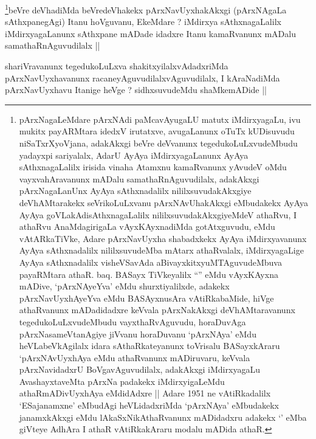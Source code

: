 
\begin{artha}
\footnote[1]{pArxNagaLeMdare pArxNAdi paMcavAyugaLU matutx
  iMdirxyagaLu, ivu mukitx payARMtara idedxV irutatxve, avugaLanunx
  oTuTx kUDisuvudu niSaTxrXyoVjana, adakAkxgi beVre deVvanunx
  tegedukoLuLxvudeMbudu yadayxpi sariyalalx, AdarU AyAya
  iMdirxyagaLanunx AyAya sAthxnagaLalilx irisida vinaha Atamxnu
  kamaRvanunx yAvudeV oMdu vayxvahAravanunx mADalu
  samathaRnAguvudilalx, adakAkxgi pArxNagaLanUnx AyAya sAthxnadalilx
  nililxsuvudakAkxgiye deVhAMtarakekx seVrikoLuLxvanu pArxNAvUhakAkxgi
  eMbudakekx AyAya AyAya goVLakAdisAthxnagaLalilx
  nililxsuvudakAkxgiyeMdeV athaRvu, I athaRvu AnaMdagirigaLa
  vAyxKAyxnadiMda gotAtxguvudu, \stext eMdu vAtARkaTiVke, Adare
  pArxNavUyxha shabadxkekx AyAya iMdirxyavanunx AyAya sAthxnadalilx
  nililxsuvudeMba mAtarx athaRvalalx, iMdirxyagaLige AyAya
  sAthxnadalilx visheVSavAda aBivayxkitxyuMTAguvudeMbuva payaRMtara
  athaR. baq. BASayx TiVkeyalilx ``\stext'' eMdu vAyxKAyxna mADive,
  `pArxNAyeYva' eMdu shurxtiyalilxde, adakekx pArxNavUyxhAyeYva eMdu
  BASAyxnusAra vAtiRkabaMide, hiVge athaRvanunx mADadidadxre keVvala
  pArxNakAkxgi deVhAMtaravanunx tegedukoLuLxvudeMbudu
  vayxthaRvAguvudu, horaDuvAga pArxNasameVtanAgiye jiVvanu horaDuvanu
  `pArxNAya' eMdu heVLabeVkAgilalx idara sAthaRkateyanunx toVrisalu
  BASayxkAraru `pArxNAvUyxhAya eMdu athaRvanunx mADiruvaru, keVvala
  pArxNavidadxrU BoVgavAguvudilalx, adakAkxgi iMdirxyagaLu
  AvashayxtaveMta pArxNa padakekx iMdirxyigaLeMdu athaRmADivUyxhAya
  eMdidAdxre || Adare 1951 ne vAtiRkadalilx `ESajanamxne' eMbudAgi
  heVLidadxriMda `pArxNAya' eMbudakekx janamxkAkxgi eMdu
  lAkaSxNikAthaRvanunx mADidadxru adakekx `\stext' eMba giVteye AdhAra
  I athaR vAtiRkakAraru modalu mADida athaR.}beVre deVhadiMda beVredeVhakekx pArxNavUyxhakAkxgi
(pArxNAgaLa sAthxpanegAgi) Itanu hoVguvanu, EkeMdare ? iMdirxya
sAthxnagaLalilx iMdirxyagaLanunx sAthxpane mADade idadxre Itanu
kamaRvanunx mADalu samathaRnAguvudilalx ||
\end{artha}


\begin{artha}
shariVravanunx tegedukoLuLxva shakitxyilalxvAdadxriMda
pArxNavUyxhavanunx racaneyAguvudilalxvAguvudilalx, I kAraNadiMda
pArxNavUyxhavu Itanige heVge ? sidhxsuvudeMdu shaMkemADide ||
\end{artha}

